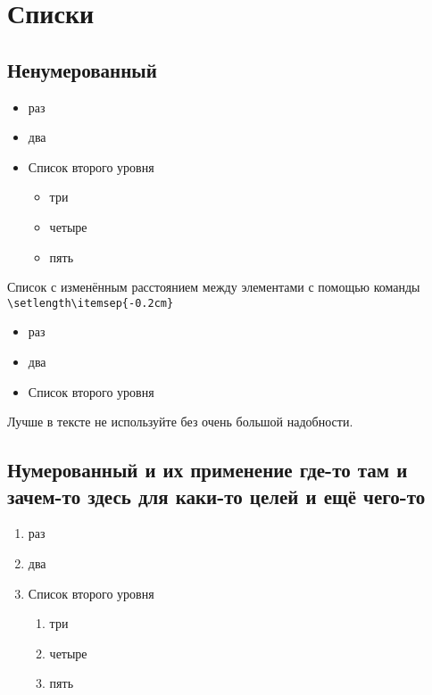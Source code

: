 \chapter{Списки}
\section{Ненумерованный}
\begin{itemize}
	\item раз
	\item два
	\item Список второго уровня
	\begin{itemize}
		\item три
		\item четыре
		\item пять
	\end{itemize}
\end{itemize}


Список с изменённым расстоянием между элементами с помощью команды \verb*|\setlength\itemsep{-0.2cm}| 
\begin{itemize}
	 \setlength\itemsep{-0.2cm}
	\item раз
	\item два
	\item Список второго уровня
\end{itemize}
Лучше в тексте не используйте без очень большой надобности.

\section{Нумерованный  и их применение где-то там и зачем-то здесь для каки-то целей и ещё чего-то}
\begin{enumerate}
	\item раз
	\item два
	\item Список второго уровня
	\begin{enumerate}
		\item три
		\item четыре
		\item пять
	\end{enumerate}
\end{enumerate}